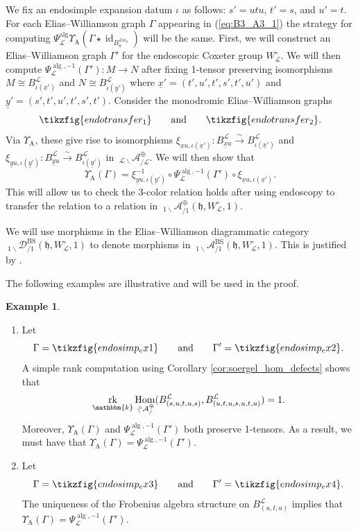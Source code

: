 \documentclass{amsart}
\renewcommand{\k}{\mathbbm{k}}
\newcommand{\scrL}{\mathcal{L}}
\DeclareMathOperator{\Hom}{Hom}
\DeclareMathOperator{\id}{id}
\DeclareMathOperator{\rk}{rk}
\newcommand{\fr}[1]{\mathfrak{#1}}
\DeclareMathOperator{\alg}{alg}
\DeclareMathOperator{\Abe}{A}
\DeclareMathOperator{\BS}{BS}
\newcommand{\EWmon}[2]{\:_{#1 \backslash} \mathcal{D}_{/ #2} }
\newcommand{\Amon}[2]{\:_{#1 \backslash} \mathcal{A}_{/ #2} }
\newcommand{\grAmon}[2]{\:_{#1 \backslash} \!\! {}^{\circ} \mathcal{A}_{/ #2} }
\newcommand{\ux}{\underline{x}}
\newcommand{\uy}{\underline{y}}
\theoremstyle{definition}
\newtheorem{example}[subsubsection]{Example}
\numberwithin{equation}{subsection}
\begin{document}
We fix an endosimple expansion datum $\iota$ as follows: $s' = utu$, $t' = s$, and $u' = t$.
For each Elias--Williamson graph $\Gamma$ appearing in (\ref{eq:B3_A3_1}) the strategy for computing $\Psi_{\scrL}^{\alg} \Upsilon_{\Abe} (\Gamma \star \id_{B_u^{\scrL w_0}})$ will be the same.
First, we will construct an Elias--Williamson graph $\Gamma'$ for the endoscopic Coxeter group $W_{\scrL}^{\circ}$.
We will then compute $\Psi_{\scrL}^{\alg, -1} (\Gamma') : M \to N$ after fixing 1-tensor preserving isomorphisms $M \cong B_{\iota (\ux')}^{\scrL}$ and $N \cong B_{\iota (\uy')}^{\scrL}$ where $\ux' = (t', u',t', s',t',u')$ and $\uy' = (s',t',u',t',s',t')$.
Consider the monodromic Elias--Williamson graphs
\[\tikzfig{endotransfer_1} \qquad\text{and}\qquad\tikzfig{endotransfer_2}.\]
Via $\Upsilon_{\Abe}$, these give rise to isomorphisms $\xi_{\ux u, \iota (\ux')} : B_{\ux u}^{\scrL} \stackrel{\sim}{\to} B_{\iota (\ux')}^{\scrL}$ and $\xi_{\uy u, \iota (\uy')} : B_{\uy u}^{\scrL} \stackrel{\sim}{\to} B_{\iota (\uy')}^{\scrL}$ in $\Amon{\scrL}{\scrL}^{\oplus}$.
We will then show that 
\[\Upsilon_{\Abe} (\Gamma) = \xi_{\uy u, \iota (\uy')}^{-1} \circ \Psi_{\scrL}^{\alg, -1} (\Gamma') \circ \xi_{\ux u, \iota (\ux')}.\]
This will allow us to check the 3-color relation holds after using endoscopy to transfer the relation to a relation in $\Amon{1}{1}^{\oplus} (\fr{h}, W_{\scrL}^{\circ}, 1)$. 

We will use morphisms in the Elias--Williamson diagrammatic category $\EWmon{1}{1}^{\BS} (\fr{h}, W_{\scrL}^{\circ}, 1)$ to denote morphisms in $\Amon{1}{1}^{\BS} (\fr{h}, W_{\scrL}^{\circ}, 1)$.
This is justified by \cite[Theorem 5.6]{Abe19}. 

The following examples are illustrative and will be used in the proof. 
\begin{example}\label{ex:B3_A3_endosimple_expansions}
    \begin{enumerate}
        \item Let
        \[\Gamma = \tikzfig{endosimp_ex1} \qquad\text{and}\qquad \Gamma' = \tikzfig{endosimp_ex2}.\]
        A simple rank computation using Corollary \ref{cor:soergel_hom_defects} shows that 
        \[\rk_{\k} \Hom_{\grAmon{}{}^{\oplus}} (B_{(s,u,t,u,s)}^{\scrL}, B_{(u,t,u,s,u,t,u)}^{\scrL}) = 1.\]
        Moreover, $\Upsilon_{\Abe} (\Gamma)$ and $\Psi_{\scrL}^{\alg, -1} (\Gamma')$ both preserve 1-tensors. As a result, we must have that $\Upsilon_{\Abe} (\Gamma) = \Psi_{\scrL}^{\alg, -1} (\Gamma')$.
        \item Let
        \[\Gamma = \tikzfig{endosimp_ex3} \qquad\text{and}\qquad \Gamma' = \tikzfig{endosimp_ex4}.\]
        The uniqueness of the Frobenius algebra structure on $B_{(u,t,u)}^{\scrL}$ implies that $\Upsilon_{\Abe} (\Gamma) = \Psi_{\scrL}^{\alg, -1} (\Gamma')$.
    \end{enumerate}
\end{example}
\end{document}
